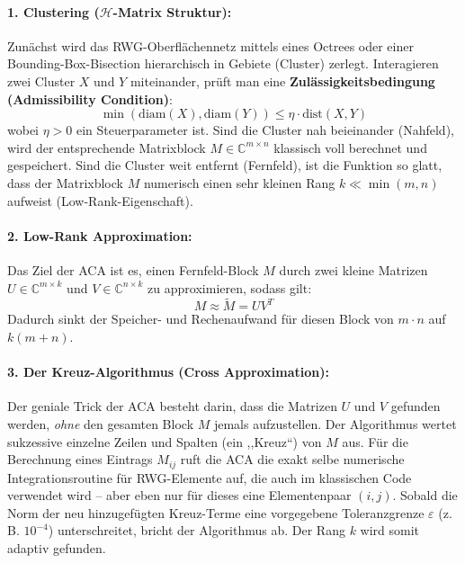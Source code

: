 \documentclass[11pt,a4paper]{article}
\begin{document}
\paragraph{1. Clustering ($\mathcal{H}$-Matrix Struktur):}
Zunächst wird das RWG-Oberflächennetz mittels eines Octrees oder einer Bounding-Box-Bisection hierarchisch in Gebiete (Cluster) zerlegt. Interagieren zwei Cluster $X$ und $Y$ miteinander, prüft man eine \textbf{Zulässigkeitsbedingung (Admissibility Condition)}:
\begin{equation}
    \min(\text{diam}(X), \text{diam}(Y)) \le \eta \cdot \text{dist}(X, Y)
\end{equation}
wobei $\eta > 0$ ein Steuerparameter ist. 
Sind die Cluster nah beieinander (Nahfeld), wird der entsprechende Matrixblock $M \in \mathbb{C}^{m \times n}$ klassisch voll berechnet und gespeichert.
Sind die Cluster weit entfernt (Fernfeld), ist die Funktion so glatt, dass der Matrixblock $M$ numerisch einen sehr kleinen Rang $k \ll \min(m, n)$ aufweist (Low-Rank-Eigenschaft).

\paragraph{2. Low-Rank Approximation:}
Das Ziel der ACA ist es, einen Fernfeld-Block $M$ durch zwei kleine Matrizen $U \in \mathbb{C}^{m \times k}$ und $V \in \mathbb{C}^{n \times k}$ zu approximieren, sodass gilt:
\begin{equation}
    M \approx \tilde{M} = U V^T
\end{equation}
Dadurch sinkt der Speicher- und Rechenaufwand für diesen Block von $m \cdot n$ auf $k(m + n)$. 

\paragraph{3. Der Kreuz-Algorithmus (Cross Approximation):}
Der geniale Trick der ACA besteht darin, dass die Matrizen $U$ und $V$ gefunden werden, \textit{ohne} den gesamten Block $M$ jemals aufzustellen. Der Algorithmus wertet sukzessive einzelne Zeilen und Spalten (ein ,,Kreuz``) von $M$ aus. Für die Berechnung eines Eintrags $M_{ij}$ ruft die ACA die exakt selbe numerische Integrationsroutine für RWG-Elemente auf, die auch im klassischen Code verwendet wird -- aber eben nur für dieses eine Elementenpaar $(i,j)$. 
Sobald die Norm der neu hinzugefügten Kreuz-Terme eine vorgegebene Toleranzgrenze $\varepsilon$ (z.\,B. $10^{-4}$) unterschreitet, bricht der Algorithmus ab. Der Rang $k$ wird somit adaptiv gefunden.
\end{document}
